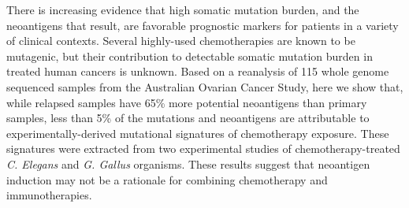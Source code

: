There is increasing evidence that high somatic mutation burden, and the neoantigens that result, are favorable prognostic markers for patients in a variety of clinical contexts. Several highly-used chemotherapies are known to be mutagenic, but their contribution to detectable somatic mutation burden in treated human cancers is unknown. Based on a reanalysis of 115 whole genome sequenced samples from the Australian Ovarian Cancer Study, here we show that, while relapsed samples have 65\% more potential neoantigens than primary samples, less than 5\% of the mutations and neoantigens are attributable to experimentally-derived mutational signatures of chemotherapy exposure. These signatures were extracted from two experimental studies of chemotherapy-treated \textit{C. Elegans} and \textit{G. Gallus} organisms. These results suggest that neoantigen induction may not be a rationale for combining chemotherapy and immunotherapies.


